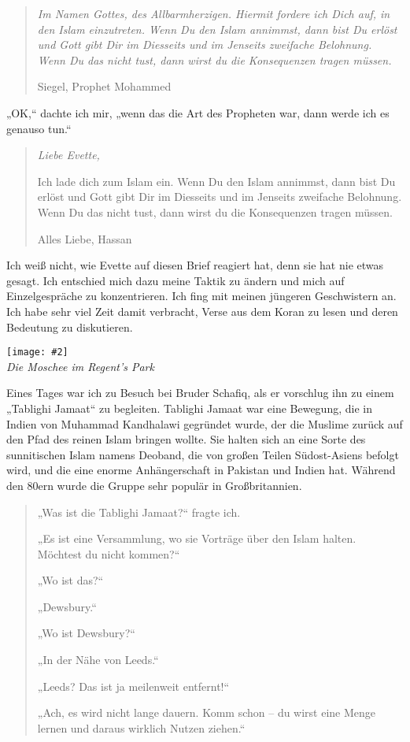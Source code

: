 \documentclass[12pt]{memoir}
\newcommand{\img}[3]{\begin{center}%
\texttt{[image: \#2]}\\{\small\em#3}%
\end{center}}
\begin{document}
\begin{quote}
\em
Im Namen Gottes, des Allbarmherzigen.
Hiermit fordere ich Dich auf, in den Islam einzutreten.
Wenn Du den Islam annimmst, dann bist Du erlöst
und Gott gibt Dir im Diesseits und im Jenseits zweifache Belohnung.
Wenn Du das nicht tust, dann wirst du die Konsequenzen tragen müssen.

Siegel, Prophet Mohammed
\end{quote}

„OK,“ dachte ich mir, „wenn das die Art des Propheten war,
dann werde ich es genauso tun.“

\begin{quote}
\em
Liebe Evette,

Ich lade dich zum Islam ein.
Wenn Du den Islam annimmst,
dann bist Du erlöst und Gott gibt Dir im Diesseits
und im Jenseits zweifache Belohnung.
Wenn Du das nicht tust, dann wirst du die Konsequenzen tragen müssen.

Alles Liebe,
Hassan
\end{quote}

Ich weiß nicht, wie Evette auf diesen Brief reagiert hat,
denn sie hat nie etwas gesagt.
Ich entschied mich dazu meine Taktik zu ändern
und mich auf Einzelgespräche zu konzentrieren.
Ich fing mit meinen jüngeren Geschwistern an.
Ich habe sehr viel Zeit damit verbracht,
Verse aus dem Koran zu lesen und deren Bedeutung zu diskutieren.

\img{scale=0.4}{Hassan_in_Regents_Park_Mosque.jpg}
{Die Moschee im Regent’s Park}

Eines Tages war ich zu Besuch bei Bruder Schafiq,
als er vorschlug ihn zu einem „Tablighi Jamaat“ zu begleiten.
Tablighi Jamaat war eine Bewegung,
die in Indien von Muhammad Kandhalawi gegründet wurde,
der die Muslime zurück auf den Pfad des reinen Islam bringen wollte.
Sie halten sich an eine Sorte des sunnitischen Islam namens Deoband,
die von großen Teilen Südost-Asiens befolgt wird,
und die eine enorme Anhängerschaft in Pakistan und Indien hat.
Während den 80ern wurde die Gruppe sehr populär in Großbritannien.

\begin{quote}
„Was ist die Tablighi Jamaat?“ fragte ich.

„Es ist eine Versammlung, wo sie Vorträge über den Islam halten.
Möchtest du nicht kommen?“

„Wo ist das?“

„Dewsbury.“

„Wo ist Dewsbury?“

„In der Nähe von Leeds.“

„Leeds? Das ist ja meilenweit entfernt!“

„Ach, es wird nicht lange dauern. Komm schon –
du wirst eine Menge lernen und daraus wirklich Nutzen ziehen.“
\end{quote}
\end{document}
